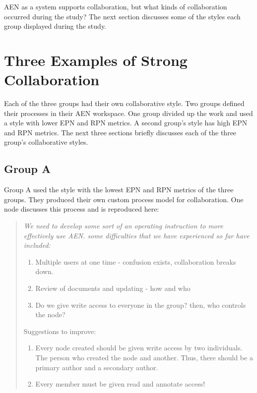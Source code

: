 AEN as a system supports collaboration, but what kinds of collaboration
occurred during the study?  The next section discusses some of the styles
each group displayed during the study.

\section{Three Examples of Strong Collaboration}
\label{sec:bottom-up}

Each of the three groups had their own collaborative style.  Two groups
defined their processes in their AEN workspace.  One group divided up the
work and used a style with lower EPN and RPN metrics.  A second group's
style has high EPN and RPN metrics.  The next three sections briefly
discusses each of the three group's collaborative styles.

\subsection{Group A}

Group A used the style with the lowest EPN and RPN metrics of the three groups.
They produced their own custom process model for collaboration.  One node
discusses this process and is reproduced here:

\begin{quote}
  {\em
  We need to develop some sort of an operating instruction to more
  effectively use AEN.  some difficulties that we have experienced so far
  have included:
  \begin{enumerate}
  \item{Multiple users at one time - confusion exists, collaboration
    breaks down.}
  \item{Review of documents and updating - how and who}
  \item{Do we give write access to everyone in the group? then, who controls
    the node?}
  \end{enumerate}
    
  Suggestions to improve:

  \begin{enumerate}
  \item{Every node created should be given write access by two individuals.
  The person who created the node and another.  Thus, there should be a
  primary author and a secondary author.}
  \item{Every member must be given read and annotate access!}
  \end{enumerate}}
\end{quote}

